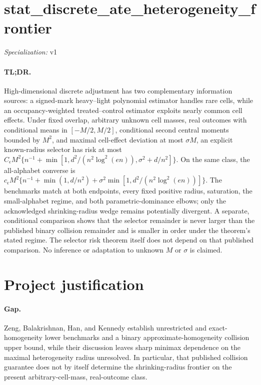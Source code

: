 \documentclass{article}
\begin{document}
\sloppy

\section*{stat\_\allowbreak{}discrete\_\allowbreak{}ate\_\allowbreak{}heterogeneity\_\allowbreak{}frontier}

\noindent\textit{Specialization:} v1\par

\paragraph{TL;DR.} High-dimensional discrete adjustment has two complementary information sources: a signed-mark heavy--light polynomial estimator handles rare cells, while an occupancy-weighted treated--control estimator exploits nearly common cell effects.  Under fixed overlap, arbitrary unknown cell masses, real outcomes with conditional means in \([-M/2,M/2]\), conditional second central moments bounded by \(M^2\), and maximal cell-effect deviation at most \(\sigma M\), an explicit known-radius selector has risk at most \(C_{\epsilon}M^2\{n^{-1}+\min[1,d^2/(n^2\log^2(en)),\sigma^2+d/n^2]\}\).  On the same class, the all-alphabet converse is \(c_{\epsilon}M^2\{n^{-1}+\min(1,d/n^2)+\sigma^2\min[1,d^2/(n^2\log^2(en))]\}\).  The benchmarks match at both endpoints, every fixed positive radius, saturation, the small-alphabet regime, and both parametric-dominance elbows; only the acknowledged shrinking-radius wedge remains potentially divergent.  A separate, conditional comparison shows that the selector remainder is never larger than the published binary collision remainder and is smaller in order under the theorem's stated regime.  The selector risk theorem itself does not depend on that published comparison.  No inference or adaptation to unknown \(M\) or \(\sigma\) is claimed.

\section{Project justification}

\paragraph{Gap.} Zeng, Balakrishnan, Han, and Kennedy establish unrestricted and exact-homogeneity lower benchmarks and a binary approximate-homogeneity collision upper bound, while their discussion leaves sharp minimax dependence on the maximal heterogeneity radius unresolved.  In particular, that published collision guarantee does not by itself determine the shrinking-radius frontier on the present arbitrary-cell-mass, real-outcome class.
\end{document}
